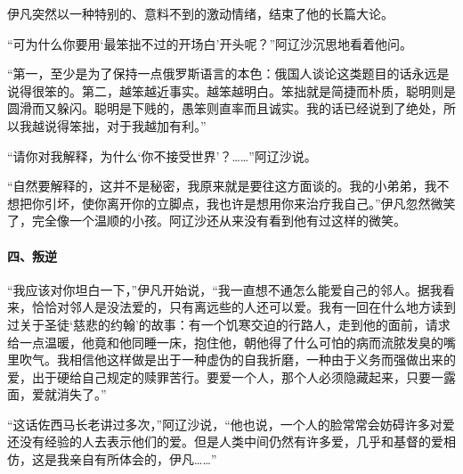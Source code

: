 \par 伊凡突然以一种特别的、意料不到的激动情绪，结束了他的长篇大论。
\par “可为什么你要用‘最笨拙不过的开场白’开头呢？”阿辽沙沉思地看着他问。
\par “第一，至少是为了保持一点俄罗斯语言的本色：俄国人谈论这类题目的话永远是说得很笨的。第二，越笨越近事实。越笨越明白。笨拙就是简捷而朴质，聪明则是圆滑而又躲闪。聪明是下贱的，愚笨则直率而且诚实。我的话已经说到了绝处，所以我越说得笨拙，对于我越加有利。”
\par “请你对我解释，为什么‘你不接受世界’？……”阿辽沙说。
\par “自然要解释的，这并不是秘密，我原来就是要往这方面谈的。我的小弟弟，我不想把你引坏，使你离开你的立脚点，我也许是想用你来治疗我自己。”伊凡忽然微笑了，完全像一个温顺的小孩。阿辽沙还从来没有看到他有过这样的微笑。
\paragraph*{四、叛逆}
\par “我应该对你坦白一下，”伊凡开始说，“我一直想不通怎么能爱自己的邻人。据我看来，恰恰对邻人是没法爱的，只有离远些的人还可以爱。我有一回在什么地方读到过关于圣徒‘慈悲的约翰’的故事：有一个饥寒交迫的行路人，走到他的面前，请求给一点温暖，他竟和他同睡一床，抱住他，朝他得了什么可怕的病而流脓发臭的嘴里吹气。我相信他这样做是出于一种虚伪的自我折磨，一种由于义务而强做出来的爱，出于硬给自己规定的赎罪苦行。要爱一个人，那个人必须隐藏起来，只要一露面，爱就消失了。”
\par “这话佐西马长老讲过多次，”阿辽沙说，“他也说，一个人的脸常常会妨碍许多对爱还没有经验的人去表示他们的爱。但是人类中间仍然有许多爱，几乎和基督的爱相仿，这是我亲自有所体会的，伊凡……”
